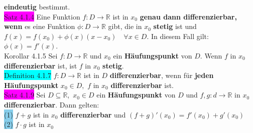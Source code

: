 \documentclass[landscape, 10pt]{article}
\newcommand{\R}{\mathbb{R}}
\begin{document}
\begin{multicols}{3}
                     \textbf{eindeutig} bestimmt.\\
              \colorbox{magenta}{Satz 4.1.4} Eine Funktion 
                     \textcolor{NavyBlue}{$f:D\longrightarrow\R$} ist in 
                     $x_0$ \textbf{genau dann differenzierbar, wenn} es eine 
                     Funktion \textcolor{NavyBlue}{$\phi:D\longrightarrow\R$}
                     gibt, die in \textcolor{NavyBlue}{$x_0$} \textbf{stetig} ist 
                     und \textcolor{NavyBlue}{$f(x)=f(x_0)+\phi(x)(x-x_0)\quad\forall x\in D$}. 
                     In diesem Fall gilt: \textcolor{NavyBlue}{$\phi(x)=f'(x)$}.\\
              \colorbox{BurntOrange}{Korollar 4.1.5} 
                     Sei \textcolor{NavyBlue}{$f:D\longrightarrow\R$}
                     und \textcolor{NavyBlue}{$x_0$} ein \textbf{Häufungspunkt} von 
                     \textcolor{NavyBlue}{$D$}. 
                     Wenn \textcolor{NavyBlue}{$f$} in \textcolor{NavyBlue}{$x_0$} 
                     \textbf{differenzierbar} ist, ist \textcolor{NavyBlue}{$f$} in 
                     \textcolor{NavyBlue}{$x_0$} 
                     \textbf{stetig}.\\
              \colorbox{cyan}{Definition 4.1.7} 
                     \textcolor{NavyBlue}{$f:D\longrightarrow\R$} 
                     ist in \textcolor{NavyBlue}{$D$} \textbf{differenzierbar}, 
                     wenn für \textbf{jeden Häufungspunkt} $x_0\in D,$
                     \textcolor{NavyBlue}{$f$} in \textcolor{NavyBlue}{$x_0$} 
                     \textbf{differenzierbar} ist.\\
              \colorbox{magenta}{Satz 4.1.9} 
                     Sei \textcolor{NavyBlue}{$D\subseteq\R$},\,
                     \textcolor{NavyBlue}{$x_0\in D$} 
                     ein \textbf{Häufungspunkt} von \textcolor{NavyBlue}{$D$} 
                     und \textcolor{NavyBlue}{$f,g:d\longrightarrow\R$} in 
                     \textcolor{NavyBlue}{$x_0$} \textbf{differenzierbar}. 
                     Dann gelten:\\
                     \colorbox{SkyBlue}{(1)} \textcolor{NavyBlue}{$f+g$}
                            ist in \textcolor{NavyBlue}{$x_0$} 
                            \textbf{differenzierbar} und 
                            \textcolor{NavyBlue}{$(f+g)'(x_0)=f'(x_0)+g'(x_0)$}\\
                     \colorbox{SkyBlue}{(2)} 
                            \textcolor{NavyBlue}{$f\cdot g$} 
                            ist in \textcolor{NavyBlue}{$x_0$} 

\end{multicols}
\end{document}
